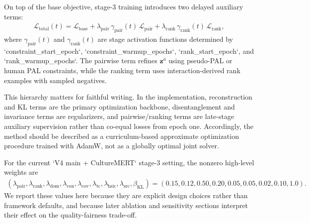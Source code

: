 On top of the base objective, stage-3 training introduces two delayed auxiliary terms:
%
\begin{align}
\mathcal{L}_{\mathrm{total}}(t)
=
\mathcal{L}_{\mathrm{base}}
 + \lambda_{\mathrm{pair}}\, \gamma_{\mathrm{pair}}(t)\, \mathcal{L}_{\mathrm{pair}}
 + \lambda_{\mathrm{rank}}\, \gamma_{\mathrm{rank}}(t)\, \mathcal{L}_{\mathrm{rank}},
\end{align}
%
where $\gamma_{\mathrm{pair}}(t)$ and $\gamma_{\mathrm{rank}}(t)$ are stage activation functions determined by `constraint_start_epoch`, `constraint_warmup_epochs`, `rank_start_epoch`, and `rank_warmup_epochs`.
The pairwise term refines $\mathbf{z}^a$ using pseudo-PAL or human PAL constraints, while the ranking term uses interaction-derived rank examples with sampled negatives.

This hierarchy matters for faithful writing. In the implementation, reconstruction and KL terms are the primary optimization backbone, disentanglement and invariance terms are regularizers, and pairwise/ranking terms are late-stage auxiliary supervision rather than co-equal losses from epoch one. Accordingly, the method should be described as a curriculum-based approximate optimization procedure trained with AdamW, not as a globally optimal joint solver.

For the current `V4 main + CultureMERT` stage-3 setting, the nonzero high-level weights are
%
\begin{align}
(\lambda_{\mathrm{pair}}, \lambda_{\mathrm{rank}}, \lambda_{\mathrm{dom}}, \lambda_{\mathrm{con}}, \lambda_{\mathrm{cov}}, \lambda_{\mathrm{tc}}, \lambda_{\mathrm{hsic}}, \lambda_{\mathrm{src}}, \beta_{\mathrm{KL}})
=
(0.15, 0.12, 0.50, 0.20, 0.05, 0.05, 0.02, 0.10, 1.0).
\end{align}
%
We report these values here because they are explicit design choices rather than framework defaults, and because later ablation and sensitivity sections interpret their effect on the quality-fairness trade-off.

